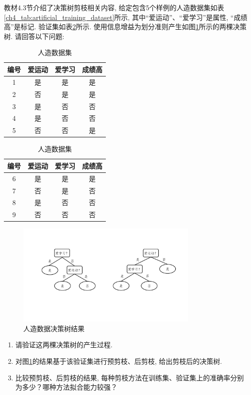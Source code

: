 \documentclass[answers]{exam}  %
\begin{document}
\begin{questions}
教材4.3节介绍了决策树剪枝相关内容, 给定包含5个样例的人造数据集如表\ref{ch4_tab:artificial_training_dataset}所示, 其中“爱运动”、“爱学习”是属性, “成绩高”是标记. 验证集如表\ref{ch4_tab:artificial_testing_dataset}所示. 使用信息增益为划分准则产生如图\ref{ch4_fig:decision_tree_1}所示的两棵决策树. 请回答以下问题: 
\begin{table}[!htb]
    \caption{人造数据集}
    \begin{minipage}[t]{.48\linewidth}
      \label{ch4_tab:artificial_training_dataset}
      \centering
        \begin{tabular}{cccc}
        \hline 编号 & 爱运动 & 爱学习 & 成绩高 \\
        \hline 1 & 是 & 是 & 是 \\
        2 & 否 & 是 & 是 \\
        3 & 是 & 否 & 否 \\
        4 & 是 & 否 & 否 \\
        5 & 否 & 否 & 是 \\
        \hline
\end{tabular}
    \end{minipage}%
    \begin{minipage}[t]{.48\linewidth}
      \centering
        \label{ch4_tab:artificial_testing_dataset}
        \begin{tabular}{cccc}
		\hline 编号 & 爱运动 & 爱学习 & 成绩高 \\
		\hline 6 & 是 & 是 & 是 \\
		7 & 否 & 是 & 否 \\
		8 & 是 & 否 & 否 \\
		9 & 否 & 否 & 否 \\
		\hline
		\end{tabular}
    \end{minipage} 
\end{table}
\begin{figure}[ht]
    \centering
    \includegraphics[width=0.8\textwidth]{figure/ch4_decision_tree_1.pdf}
    \caption{人造数据决策树结果}\label{ch4_fig:decision_tree_1}
\end{figure}
\begin{enumerate}
    \item 
    请验证这两棵决策树的产生过程.
    \item 
     对图\ref{ch4_fig:decision_tree_1}的结果基于该验证集进行预剪枝、后剪枝, 给出剪枝后的决策树. 
    \item
    比较预剪枝、后剪枝的结果, 每种剪枝方法在训练集、验证集上的准确率分别为多少？哪种方法拟合能力较强？
\end{enumerate}


\end{questions}
\end{document}
